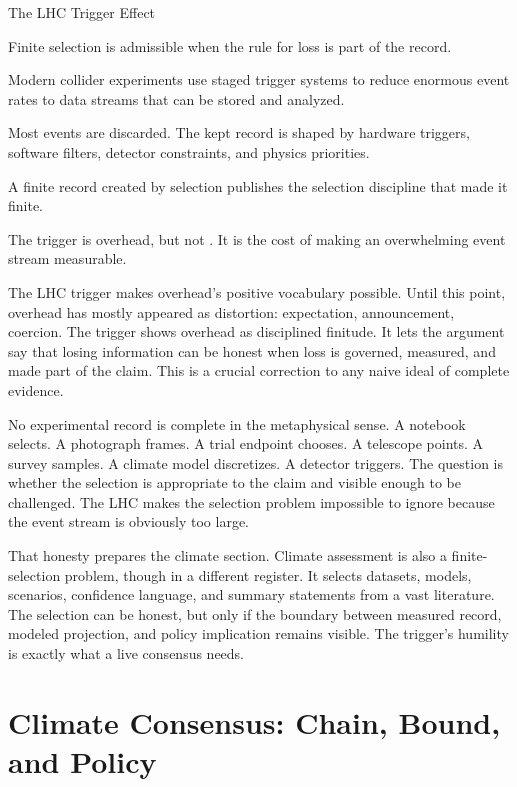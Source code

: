 \begin{phenom}{The LHC Trigger Effect~\cite{lhctrigger2017}}
\label{ph:lhc-trigger}

\PhStatement
Finite selection is admissible when the rule for loss is part of the record.

\PhOrigin
Modern collider experiments use staged trigger systems to reduce enormous event
rates to data streams that can be stored and analyzed.

\PhObservation
Most events are discarded. The kept record is shaped by hardware triggers,
software filters, detector constraints, and physics priorities.

\PhConstraint
A finite record created by selection publishes the selection discipline that
made it finite.

\PhConsequence
The trigger is overhead, but not . It is the cost of making an
overwhelming event stream measurable.
\end{phenom}

The LHC trigger makes overhead's positive vocabulary possible. Until this
point, overhead has mostly appeared as distortion: expectation, announcement,
coercion. The trigger shows overhead as disciplined finitude. It lets the argument
say that losing information can be honest when loss is governed, measured, and
made part of the claim. This is a crucial correction to any naive ideal of
complete evidence.

No experimental record is complete in the metaphysical sense. A notebook
selects. A photograph frames. A trial endpoint chooses. A telescope points.
A survey samples. A climate model discretizes. A detector triggers. The
question is whether the selection is appropriate to the claim and visible
enough to be challenged. The LHC makes the selection problem impossible to
ignore because the event stream is obviously too large.

That honesty prepares the climate section. Climate assessment is also a
finite-selection problem, though in a different register. It selects datasets,
models, scenarios, confidence language, and summary statements from a vast
literature. The selection can be honest, but only if the boundary between
measured record, modeled projection, and policy implication remains visible.
The trigger's humility is exactly what a live consensus needs.

\section{Climate Consensus: Chain, Bound, and Policy}

